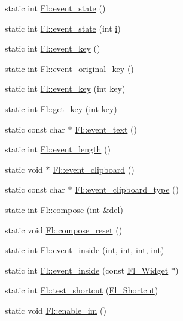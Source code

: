\begin{DoxyCompactItemize}
\item 
static int \hyperlink{group__fl__events_gafa17a5b4d8d9163631c88142e60447ed}{Fl\+::event\+\_\+state} ()
\item 
static int \hyperlink{group__fl__events_ga1ff4a74294e833593504ff6531b6d459}{Fl\+::event\+\_\+state} (int \hyperlink{forms_8_h_acb559820d9ca11295b4500f179ef6392}{i})
\item 
static int \hyperlink{group__fl__events_ga1ac131e3cd5ca674cc022b1f77233449}{Fl\+::event\+\_\+key} ()
\item 
static int \hyperlink{group__fl__events_gadec41d640b647e422b88331015ab660d}{Fl\+::event\+\_\+original\+\_\+key} ()
\item 
static int \hyperlink{group__fl__events_ga0647361133efe8f9bdbcf6d462116236}{Fl\+::event\+\_\+key} (int key)
\item 
static int \hyperlink{group__fl__events_gae7cc46c942d3b62b6b55422d185b6b8d}{Fl\+::get\+\_\+key} (int key)
\item 
static const char $\ast$ \hyperlink{group__fl__events_ga6647c55948fe1d8be9367267529e9c54}{Fl\+::event\+\_\+text} ()
\item 
static int \hyperlink{group__fl__events_ga38f2de89fbdf59ad2cd4dca93f472911}{Fl\+::event\+\_\+length} ()
\item 
static void $\ast$ \hyperlink{group__fl__events_ga5964867d1d60792c45bb28082c257624}{Fl\+::event\+\_\+clipboard} ()
\item 
static const char $\ast$ \hyperlink{group__fl__events_ga4c229daff88166ff492b1332c1568899}{Fl\+::event\+\_\+clipboard\+\_\+type} ()
\item 
static int \hyperlink{group__fl__events_ga2c16ab49eb753b98f3d8f1e96429d094}{Fl\+::compose} (int \&del)
\item 
static void \hyperlink{group__fl__events_ga1d787045e08159645b063889d2f2414a}{Fl\+::compose\+\_\+reset} ()
\item 
static int \hyperlink{group__fl__events_ga9cd798b5409aa7556b3a8db32ec54785}{Fl\+::event\+\_\+inside} (int, int, int, int)
\item 
static int \hyperlink{group__fl__events_gac52216ca85bde31979bdd63c1a70f898}{Fl\+::event\+\_\+inside} (const \hyperlink{class_fl___widget}{Fl\+\_\+\+Widget} $\ast$)
\item 
static int \hyperlink{group__fl__events_gac2ccd662dde8e38ad38a384bf18b84e0}{Fl\+::test\+\_\+shortcut} (\hyperlink{fl__types_8h_a37ec1cd050a604a45dff00efba45609d}{Fl\+\_\+\+Shortcut})
\item 
static void \hyperlink{group__fl__events_ga9552df530b2efea9a81fa04d872d3f2a}{Fl\+::enable\+\_\+im} ()

\end{DoxyCompactItemize}
